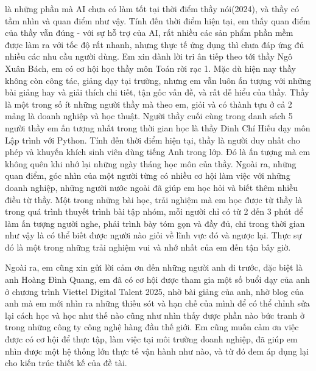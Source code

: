 \documentclass[../BTL.tex]{subfiles}
\begin{document}
là những phần mà AI chưa có làm tốt tại thời điểm thầy nói(2024), và thầy có tầm nhìn và quan điểm như vậy. Tính đến thời điểm hiện tại, em thấy quan điểm của thầy vẫn đúng - với sự hỗ trợ của AI, rất nhiều các sản phẩm phần mềm được làm ra với tốc độ rất nhanh, nhưng thực tế ứng dụng thì chưa đáp ứng đủ nhiều các nhu cầu người dùng. Em xin dành lời tri ân tiếp theo tới thầy Ngô Xuân Bách, em có cơ hội học thầy môn Toán rời rạc 1. Mặc dù hiện nay thầy không còn công tác, giảng dạy tại trường, nhưng em vẫn luôn ấn tượng với những bài giảng hay và giải thích chi tiết, tận gốc vấn đề, và rất dễ hiểu của thầy. Thầy là một trong số ít những người thầy mà theo em, giỏi và có thành tựu ở cả 2 mảng là doanh nghiệp và học thuật. Người thầy cuối cùng trong danh sách 5 người thầy em ấn tượng nhất trong thời gian học là thầy Đinh Chí Hiếu dạy môn Lập trình với Python. Tính đến thời điểm hiện tại, thầy là người duy nhất cho phép và khuyến khích sinh viên dùng tiếng Anh trong lớp. Đó là ấn tượng mà em không quên khi nhớ lại những ngày tháng học môn của thầy. Ngoài ra, những quan điểm, góc nhìn của một người từng có nhiều cơ hội làm việc với những doanh nghiệp, những người nước ngoài đã giúp em học hỏi và biết thêm nhiều điều từ thầy. Một trong những bài học, trải nghiệm mà em học được từ thầy là trong quá trình thuyết trình bài tập nhóm, mỗi người chỉ có từ 2 đến 3 phút để làm ấn tượng người nghe, phải trình bày tóm gọn và đầy đủ, chỉ trong thời gian như vậy là có thể biết được người nào giỏi về lĩnh vực đó và ngược lại. Thực sự đó là một trong những trải nghiệm vui và nhớ nhất của em đến tận bây giờ. 

Ngoài ra, em cũng xin gửi lời cảm ơn đến những người anh đi trước, đặc biệt là anh Hoàng Đình Quang, em đã có cơ hội được tham gia một số buổi dạy của anh ở chương trình Viettel Digital Talent 2025, nhờ bài giảng của anh, nhờ blog của anh mà em mới nhìn ra những thiếu sót và hạn chế của mình để có thể chỉnh sửa lại cách học và học như thế nào cũng như nhìn thấy được phần nào bức tranh ở trong những công ty công nghệ hàng đầu thế giới. Em cũng muốn cảm ơn việc được có cơ hội để thực tập, làm việc tại môi trường doanh nghiệp, đã giúp em nhìn được một hệ thống lớn thực tế vận hành như nào, và từ đó đem áp dụng lại cho kiến trúc thiết kế của đề tài. 
\end{document}
